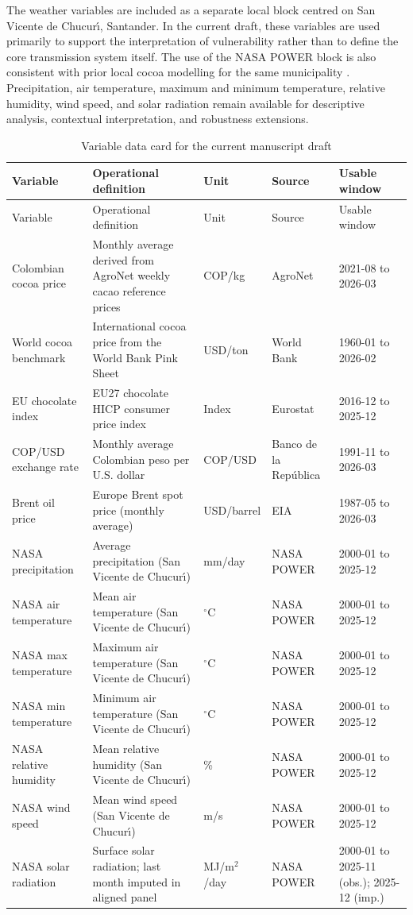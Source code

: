 \documentclass[11pt]{article}
\begin{document}
The weather variables are included as a separate local block centred on San Vicente de Chucur\'{\i}, Santander. In the current draft, these variables are used primarily to support the interpretation of vulnerability rather than to define the core transmission system itself. The use of the NASA POWER block is also consistent with prior local cocoa modelling for the same municipality \citep{talero_sarmiento_etal_2025}. Precipitation, air temperature, maximum and minimum temperature, relative humidity, wind speed, and solar radiation remain available for descriptive analysis, contextual interpretation, and robustness extensions.
\begingroup
\scriptsize
\setlength{\LTleft}{0pt}
\setlength{\LTright}{0pt}
\begin{longtable}{@{}p{2.6cm}p{3.6cm}p{1.4cm}p{2.2cm}p{2.8cm}@{}}
\caption{Variable data card for the current manuscript draft}
\label{tab:data_card}\\
\toprule
Variable & Operational definition & Unit & Source & Usable window \\
\midrule
\endfirsthead
\toprule
Variable & Operational definition & Unit & Source & Usable window \\
\midrule
\endhead
Colombian cocoa price & Monthly average derived from AgroNet weekly cacao reference prices & COP/kg & AgroNet & 2021-08 to 2026-03 \\
World cocoa benchmark & International cocoa price from the World Bank Pink Sheet & USD/ton & World Bank & 1960-01 to 2026-02 \\
EU chocolate index & EU27 chocolate HICP consumer price index & Index & Eurostat & 2016-12 to 2025-12 \\
COP/USD exchange rate & Monthly average Colombian peso per U.S. dollar & COP/USD & Banco de la Rep\'ublica & 1991-11 to 2026-03 \\
Brent oil price & Europe Brent spot price (monthly average) & USD/barrel & EIA & 1987-05 to 2026-03 \\
NASA precipitation & Average precipitation (San Vicente de Chucur\'{\i}) & mm/day & NASA POWER & 2000-01 to 2025-12 \\
NASA air temperature & Mean air temperature (San Vicente de Chucur\'{\i}) & $^\circ$C & NASA POWER & 2000-01 to 2025-12 \\
NASA max temperature & Maximum air temperature (San Vicente de Chucur\'{\i}) & $^\circ$C & NASA POWER & 2000-01 to 2025-12 \\
NASA min temperature & Minimum air temperature (San Vicente de Chucur\'{\i}) & $^\circ$C & NASA POWER & 2000-01 to 2025-12 \\
NASA relative humidity & Mean relative humidity (San Vicente de Chucur\'{\i}) & \% & NASA POWER & 2000-01 to 2025-12 \\
NASA wind speed & Mean wind speed (San Vicente de Chucur\'{\i}) & m/s & NASA POWER & 2000-01 to 2025-12 \\
NASA solar radiation & Surface solar radiation; last month imputed in aligned panel & MJ/m$^2$/day & NASA POWER & 2000-01 to 2025-11 (obs.); 2025-12 (imp.) \\
\bottomrule
\end{longtable}
\endgroup
\end{document}
